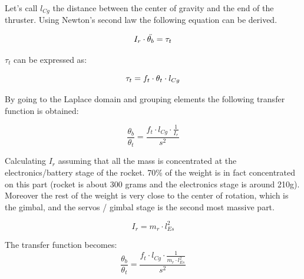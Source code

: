 		Let's call $l_{Cg}$ the distance between the center of gravity and the end of the thruster.
		Using Newton's second law the following equation can be derived.

		\begin{equation}
			I_r \cdot \ddot{\theta_b}=\tau_t \addunit{\newton$\cdot$\meter} \label{eq:rocket_angle_1}
		\end{equation}
		\startexplain
		\stopexplain
		
		$\tau_t$ can be expressed as:
		
		\begin{equation}
		\tau_t=f_t \cdot \theta_t \cdot l_{Cg} \addunit{\newton$\cdot$\meter} \label{eq:rocket_angle_2}
		\end{equation}
		\startexplain
		\stopexplain
		
		By going to the Laplace domain and grouping elements the following transfer function is obtained:
		
		\begin{equation}
		\frac{\theta_b}{\theta_t} = \frac{f_t \cdot l_{Cg} \cdot \frac{1}{I_r}}{s^2}
		\label{eq:rocket_angle_model_tf_1}
		\end{equation}
		
		Calculating $I_r$ assuming that all the mass is concentrated at the electronics/battery stage of the rocket. 70\% of the weight is in fact concentrated on this part (rocket is about 300 grams and the electronics stage is around 210g). Moreover the rest of the weight is very close to the center of rotation, which is the gimbal, and the servos / gimbal stage is the second most massive part.
		
		\begin{equation}
		I_r=m_r \cdot l_{Es}^2 \label{eq:rocket_angle_3}
		\end{equation}
		\startexplain
		\stopexplain
		
		The transfer function becomes:
		\begin{equation}
		\frac{\theta_b}{\theta_t} = \frac{f_t \cdot l_{Cg} \cdot \frac{1}{m_r \cdot l_{Es}^2}}{s^2}
		\label{eq:rocket_angle_model_tf_2}
		\end{equation}
		
